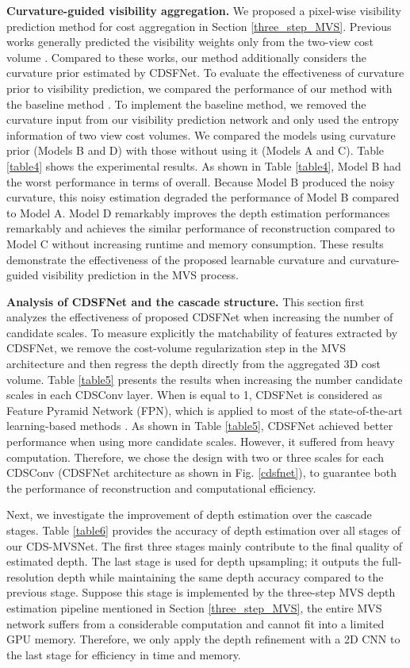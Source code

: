 \documentclass{article} \usepackage{iclr2022_conference,times}
\begin{document}
\textbf{Curvature-guided visibility aggregation.} We proposed a pixel-wise visibility prediction method for cost aggregation in Section \ref{three_step_MVS}. Previous works generally predicted the visibility weights only from the two-view cost volume \citep{zhang2020visibility, xu2020pvsnet}. Compared to these works, our method additionally considers the curvature prior estimated by CDSFNet. To evaluate the effectiveness of curvature prior to visibility prediction, we compared the performance of our method with the baseline method \cite{zhang2020visibility}. To implement the baseline method, we removed the curvature input from our visibility prediction network and only used the entropy information of two view cost volumes. 
We compared the models using curvature prior (Models B and D) with those without using it (Models A and C). Table \ref{table4} shows the experimental results. As shown in Table \ref{table4}, Model B had the worst performance in terms of overall. Because Model B produced the noisy curvature, this noisy estimation degraded the performance of Model B compared to Model A. Model D remarkably improves the depth estimation performances remarkably and achieves the similar performance of reconstruction compared to Model C without increasing runtime and memory consumption. These results demonstrate the effectiveness of the proposed learnable curvature and curvature-guided visibility prediction in the MVS process.


\textbf{Analysis of CDSFNet and the cascade structure.} This section first analyzes the effectiveness of proposed CDSFNet when increasing the number of candidate scales. To measure explicitly the matchability of features extracted by CDSFNet, we remove the cost-volume regularization step in the MVS architecture and then regress the depth directly from the aggregated 3D cost volume. Table \ref{table5} presents the results when increasing the number candidate scales  in each CDSConv layer. When  is equal to 1, CDSFNet is considered as Feature Pyramid Network (FPN), which is applied to most of the state-of-the-art learning-based methods \citep{gu2020cascade, zhang2020visibility}. As shown in Table \ref{table5},  CDSFNet achieved better performance when using more candidate scales. However, it suffered from heavy computation. Therefore, we chose the design with two or three scales for each CDSConv (CDSFNet architecture as shown in Fig. \ref{cdsfnet}), to guarantee both the performance of reconstruction and computational efficiency.

Next, we investigate the improvement of depth estimation over the cascade stages. Table \ref{table6} provides the accuracy of depth estimation over all stages of our CDS-MVSNet. The first three stages mainly contribute to the final quality of estimated depth. The last stage  is used for depth upsampling; it outputs the full-resolution depth while maintaining the same depth accuracy compared to the previous stage. Suppose this stage is implemented by the three-step MVS depth estimation pipeline mentioned in Section \ref{three_step_MVS}, the entire MVS network suffers from a considerable computation and cannot fit into a limited GPU memory. Therefore, we only apply the depth refinement with a 2D CNN to the last stage for efficiency in time and memory.
\newpage
\end{document}
